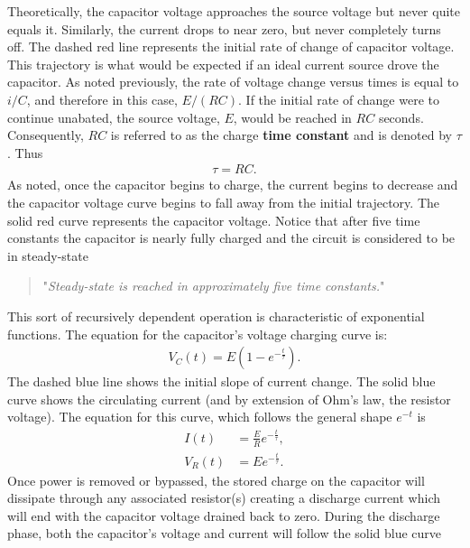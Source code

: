 \documentclass{report}
\begin{document}
\begin{itemize}
            Theoretically, the capacitor voltage approaches the source voltage but never quite equals it.
            \bigbreak \noindent 
            Similarly, the current drops to near zero, but never completely turns off.
            \bigbreak \noindent 
            \bigbreak \noindent 
            The dashed red line represents the initial rate of change of capacitor voltage. This trajectory is what would be expected if an ideal current source drove the capacitor. As noted previously, the rate of voltage change versus times is equal to $i/C$, and therefore in this case, $E/(RC)$. If the initial rate of change were to continue unabated, the source voltage, $E$, would be reached in $RC$ seconds. Consequently, $RC$ is referred to as the charge \textbf{time constant} and is denoted by $\tau$. Thus
            \begin{align*}
                \tau = RC
            .\end{align*}
            As noted, once the capacitor begins to charge, the current begins to decrease and the capacitor voltage curve begins to fall away from the initial trajectory. The solid red curve represents the capacitor voltage. Notice that after five time constants the capacitor is nearly fully charged and the circuit is considered to be in steady-state
            \begin{quote}
               "\textit{Steady-state is reached in approximately five time constants.}" 
            \end{quote}
            This sort of recursively dependent operation is characteristic of exponential functions. The equation for the capacitor's voltage charging curve is:
            \begin{align*}
                V_{C}(t) = E\left(1-e^{-\frac{t}{\tau}}\right)
            .\end{align*}
            The dashed blue line shows the initial slope of current change. The solid blue curve shows the circulating current (and by extension of Ohm's law, the resistor voltage). The equation for this curve, which follows the general shape $e^{-t}$ is 
            \begin{align*}
                I(t) &= \frac{E}{R}e^{-\frac{t}{\tau}}, \\
                V_{R}(t) &= Ee^{-\frac{t}{\tau}}
            .\end{align*}
            Once power is removed or bypassed, the stored charge on the capacitor will dissipate through any associated resistor(s) creating a discharge current which will end with the capacitor voltage drained back to zero. During the discharge phase, both the capacitor's voltage and current will follow the solid blue curve

\end{itemize}
\end{document}
